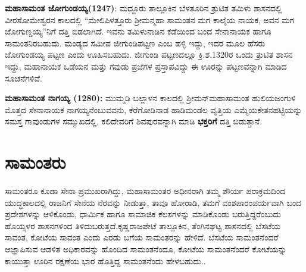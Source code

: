 \textbf{ಮಹಾಸಾಮಂತ ಜೋಗುಂಡಯ್ಯ(1247)}: ಮದ್ದೂರು ತಾಲ್ಲೂಕಿನ ಬೆಳತೂರಿನ ತ್ರುಟಿತ ತಮಿಳು ಶಾಸನದಲ್ಲಿ ವೀರಸೋಮೇಶ್ವರನ ಕಾಲದಲ್ಲಿ “ಮೇಲಿಪಿಳತ್ತೂರು ಶ‍್ರೀಮನ್ಮಹಾ ಸಾಮಂತನ ಮಗ ಕಾಲೈಯ ನಾಯಕ, ಅವನ ಮಗ ಜೋಗುಣ್ಡಯ್ಯ”ನಿಗೆ ದತ್ತಿ ಬಿಡಲಾಗಿದೆ. ಇವನು ತಮಿಳುನಾಡಿನ ಕಡೆಯಿಂದ ಬಂದ ಸೇನಾನಾಯಕ ಹಾಗೂ ಸಾಮಂತನಿರಬಹುದು. ಮಂಡ್ಯದ ಸಮೀಪ ಜೀಗುಂಡಿಪಟ್ಟಣ ಎಂಬ ಹಳ್ಳಿ ಇದ್ದು, ಇದರ ಮೂಲ ಹೆಸರು ಜೋಗುಂಡಯ್ಯ ಪಟ್ಟಣ ಎಂದು ಊಹಿಸಬಹುದು. ಜೀಗುಂಡಿ ಪಟ್ಟಣದಲ್ಲೂ ಕ್ರಿ.ಶ.1320ರ ಒಂದು ತ್ರುಟಿತ ಶಾಸನ ಇದ್ದು, ಮಹಾನಾಯಕ ಒಡೆಯನ ಮತ್ತು ಗವುಡು ಪ್ರಜೆಗಳ ಪ್ರಸ್ತಾಪವಿದ್ದು ಈ ಊರನ್ನು ಪಟ್ಟಣವನ್ನಾಗಿ ಮಾಡಿದ ಸೂಚನೆಗಳಿವೆ.

\textbf{ಮಹಾಸಾಮಂತ ನಾಗಯ್ಯ (1280):} ಮುಮ್ಮಡಿ ಬಲ್ಲಾಳನ ಕಾಲದಲ್ಲಿ ಶ‍್ರೀಮನ್​ ಮಹಾಸಾಮಂತ ಹುಲಿಯಜಂಗುಳಿ ಮೊತ್ತದ ಸೇನಾನಾಯಕ ನಾಗಯ್ಯನೆಂಬುವವನು, ಕೆರೆಗೋಡಿನಾಡ ಹಾಡಿಮಂಡಲ ವೃತ್ತಿಯ ಎಮ್ಮೆಯಕೇತನಹಟ್ಟಿಯನ್ನು ಸಮಸ್ತ ಗಾವುಂಡುಗಳ ಸಮ್ಮುಖದಲ್ಲಿ, ಕಲಿದೇವರಿಗೆ ಶಿವಪುರವನ್ನಾಗಿ ಮಾಡಿ \textbf{ಭಕ್ತರಿಗೆ }ದತ್ತಿ ಬಿಡುತ್ತಾನೆ.


\section{ಸಾಮಂತರು}

ಸಾಮಂತರೂ ಕೂಡಾ ಸೇನಾ ಪ್ರಮುಖರಾಗಿದ್ದು, ಮಹಾಸಾಮಂತರ ಅಧೀನರಾಗಿ ತಮ್ಮ ಶೌರ್ಯ ಪರಾಕ್ರಮದಿಂದ ಯುದ್ಧಕಾಲದಲ್ಲಿ ರಾಜನಿಗೆ ಸೇನೆಯ ನೆರವನ್ನು ನೀಡುತ್ತಾ, ತಾವೂ ಹೋರಾಡಿ, ತಮಗೆ ವಂಶಪಾರಂಪರ್ಯವಾಗಿ ಬಂದ ಪ್ರದೇಶಗಳನ್ನು ಆಳಿಕೊಂಡು, ಧಾರ್ಮಿಕ ಹಾಗೂ ಸಾಮಾಜಿಕ ಕೆಲಸಗಳನ್ನು ಮಾಡಿಕೊಂಡು ಬರುತ್ತಿದ್ದರೆಂಬುದು ಹೊಯ್ಸಳರ ಶಾಸನಗಳಿಂದ ತಿಳಿದುಬರುತ್ತದೆ.\break ಕೃಷ್ಣರಾಜಪೇಟೆ ತಾಲ್ಲೂಕಿನ, ತೆಂಗಿನಘಟ್ಟ ಶಾಸನದಲ್ಲಿ ಬೆಸಟೆಯ ಸಾವಂತ, ಕೋಟೆಯ ಸಾವಂತ ಎಂದು ಎರಡು ಬಗೆಯ ಸಾಮಂತರನ್ನು ಹೇಳಿದೆ. ಬೆಸಟೆಯ ಸಾಮಂತನೆಂದರೆ ಆಜ್ಞಾಪಿಸುವ ಆಡಳಿತ ಅಧಿಕಾರವನ್ನು ಹೊಂದಿದ ಸಾಮಂತನೆಂದೂ, ಕೋಟೆಯ ಸಾಮಂತನೆಂದರೆ ಕೋಟೆಯನ್ನು ಕಾಯುತ್ತಾ ಊರಿನ ರಕ್ಷಣೆಯ ಭಾರ ಹೊತ್ತಿದ್ದ ಸಾಮಂತನೆಂದು ಹೇಳಬಹುದು..

